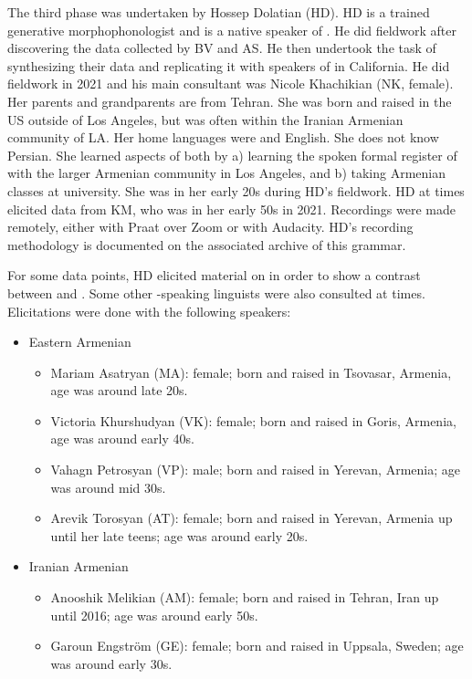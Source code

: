 The third phase was undertaken by  Hossep Dolatian (HD). HD is a trained generative morphophonologist and is a native speaker of {\swaSWA}. He did fieldwork after discovering the data collected by BV and AS. He then undertook the task of synthesizing   their data and replicating it with speakers of {\iaIA} in California.  He did fieldwork in 2021 and his main consultant was  Nicole Khachikian (NK, female). Her parents and grandparents are from Tehran.  She was born and raised in the US outside of Los Angeles, but was often within the Iranian Armenian community of LA.  Her home languages were {\iaIA} and English. She does not know Persian. She learned aspects of {\seaSEA} both  by a) learning the spoken formal register of {\seaSEA} with the larger Armenian community in Los Angeles, and b) taking Armenian classes at university.  She was in her early 20s during HD's fieldwork. HD at times elicited data from KM, who was in her early 50s in 2021. Recordings were made remotely,  either with Praat \citep{boersma-2001-praat} over Zoom or with Audacity. HD's recording methodology is documented on the associated archive of this grammar.

For some data points, HD elicited material on {\seaSEA}   in order to show a contrast between {\seaSE} and {\iaIA}. Some other {\iaAbbre}-speaking linguists were also consulted at times. Elicitations were done with the following speakers:

\begin{itemize}
	\item Eastern Armenian
	\begin{itemize}
	\item 	Mariam Asatryan (MA): female; born and raised in Tsovasar, Armenia, age was around late 20s. 
	\item Victoria Khurshudyan (VK): female; born and raised in Goris, Armenia, age was around early 40s. 
	\item Vahagn Petrosyan (VP): male; born and raised in Yerevan, Armenia; age was around mid 30s. 
	\item    Arevik Torosyan (AT): female; born and raised in Yerevan, Armenia up until her late teens; age was around early 20s. 
\end{itemize}
\item Iranian Armenian
\begin{itemize}
 \item Anooshik Melikian (AM): female; born and raised in Tehran, Iran up until 2016; age was around early 50s.
	\item Garoun Engström (GE): female; born and raised in Uppsala, Sweden; age was around early 30s.
	
\end{itemize}
\end{itemize}

